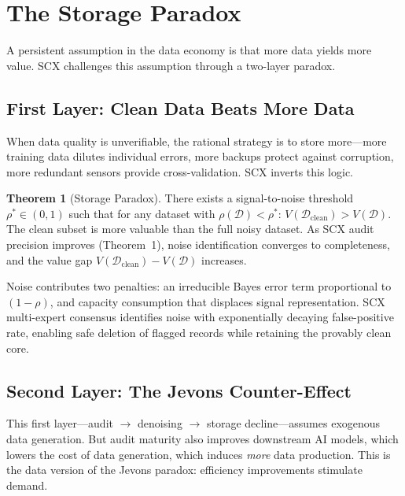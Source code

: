 \documentclass[twocolumn]{article}
\theoremstyle{definition}
\newtheorem{theorem}{Theorem}
\begin{document}
\section{The Storage Paradox}
\label{sec:storage}

A persistent assumption in the data economy is that more data yields more value. SCX challenges this assumption through a two-layer paradox.

\subsection{First Layer: Clean Data Beats More Data}

When data quality is unverifiable, the rational strategy is to store more---more training data dilutes individual errors, more backups protect against corruption, more redundant sensors provide cross-validation. SCX inverts this logic.

\begin{theorem}[Storage Paradox]
\label{thm:storage}
There exists a signal-to-noise threshold $\rho^* \in (0,1)$ such that for any dataset with $\rho(\mathcal{D}) < \rho^*$: $V(\mathcal{D}_{\text{clean}}) > V(\mathcal{D})$. The clean subset is more valuable than the full noisy dataset. As SCX audit precision improves (Theorem~1), noise identification converges to completeness, and the value gap $V(\mathcal{D}_{\text{clean}}) - V(\mathcal{D})$ increases.
\end{theorem}

Noise contributes two penalties: an irreducible Bayes error term proportional to $(1-\rho)$, and capacity consumption that displaces signal representation. SCX multi-expert consensus identifies noise with exponentially decaying false-positive rate, enabling safe deletion of flagged records while retaining the provably clean core.

\subsection{Second Layer: The Jevons Counter-Effect}

This first layer---audit $\to$ denoising $\to$ storage decline---assumes exogenous data generation. But audit maturity also improves downstream AI models, which lowers the cost of data generation, which induces \emph{more} data production. This is the data version of the Jevons paradox: efficiency improvements stimulate demand.
\end{document}
